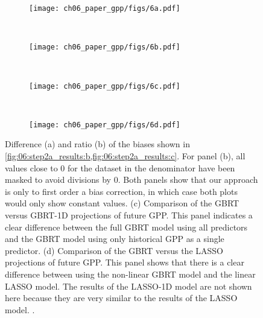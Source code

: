 \begin{figure}[!t]
  \centering
  \begin{subfigure}[b]{\SubfigureWidth{}}
    \texttt{[image: ch06\_paper\_gpp/figs/6a.pdf]}
    \caption{}
    \label{fig:06:step2a_results_biases:a}
  \end{subfigure}
  ~
  \begin{subfigure}[b]{\SubfigureWidth{}}
    \texttt{[image: ch06\_paper\_gpp/figs/6b.pdf]}
    \caption{}
    \label{fig:06:step2a_results_biases:b}
  \end{subfigure}
  \\
  \begin{subfigure}[b]{\SubfigureWidth{}}
    \texttt{[image: ch06\_paper\_gpp/figs/6c.pdf]}
    \caption{}
    \label{fig:06:step2a_results_biases:c}
  \end{subfigure}
  ~
  \begin{subfigure}[b]{\SubfigureWidth{}}
    \texttt{[image: ch06\_paper\_gpp/figs/6d.pdf]}
    \caption{}
    \label{fig:06:step2a_results_biases:d}
  \end{subfigure}
  \caption[
    Further illustrations of our \acl{ML} approach to constrain projected
    absolute \acf{GPP} at the end of the  century with observations in
    Step 2a and comparison to other statistical models.
  ]{
    Difference (a) and ratio (b) of the biases shown in
    \cref{fig:06:step2a_results:b,fig:06:step2a_results:c}. For panel (b), all
    values close to $0$ for the dataset in the denominator have been masked to
    avoid divisions by $0$. Both panels show that our approach is only to first
    order a bias correction, in which case both plots would only show constant
    values. (c) Comparison of the \acf{GBRT} versus \acs{GBRT}-1D projections
    of future \acf{GPP}. This panel indicates a clear difference between the
    full \acs{GBRT} model using all predictors and the \acs{GBRT} model using
    only historical \acs{GPP} as a single predictor. (d) Comparison of the
    \acs{GBRT} versus the \acf{LASSO} projections of future \acs{GPP}. This
    panel shows that there is a clear difference between using the non-linear
    \acs{GBRT} model and the linear \acs{LASSO} model. The results of the
    \acs{LASSO}-1D model are not shown here because they are very similar to
    the results of the \acs{LASSO} model. .
  }
  \label{fig:06:step2a_results_biases}
\end{figure}

